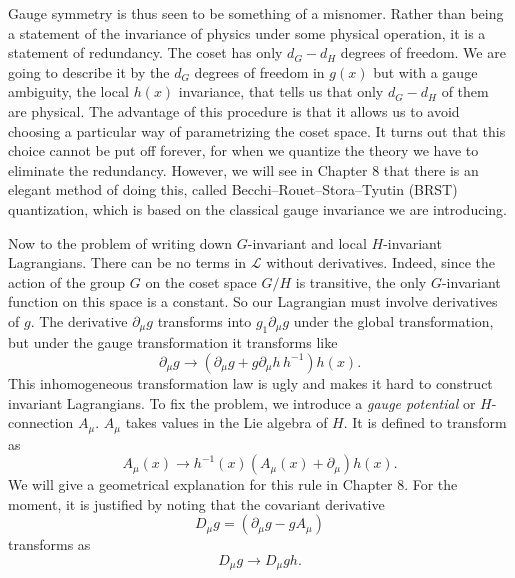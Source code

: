 Gauge symmetry is thus seen to be something of a misnomer. Rather than being a
statement of the invariance of physics under some physical operation, it is a
statement of redundancy. The coset has only $d_G-d_H$ degrees of freedom. We
are going to describe it by the $d_G$ degrees of freedom in $g(x)$ but with a
gauge ambiguity, the local $h(x)$ invariance, that tells us that only
$d_G-d_H$ of them are physical. The advantage of this procedure is that it
allows us to avoid choosing a particular way of parametrizing the coset space.
It turns out that this choice cannot be put off forever, for when we quantize
the theory we have to eliminate the redundancy. However, we will see in Chapter
8 that there is an elegant method of doing this, called Becchi--Rouet--Stora--Tyutin
(BRST) quantization, which is based on the classical gauge invariance we are
introducing.

Now to the problem of writing down $G$-invariant and local $H$-invariant
Lagrangians. There can be no terms in $\mathcal L$ without derivatives.
Indeed, since the action of the group $G$ on the coset space $G/H$ is
transitive, the only $G$-invariant function on this space is a constant. So our
Lagrangian must involve derivatives of $g$. The derivative $\partial_\mu g$
transforms into $g_1\partial_\mu g$ under the global transformation, but under
the gauge transformation it transforms like
\begin{equation}
  \partial_\mu g\longrightarrow(\partial_\mu g+g\partial_\mu h\,h^{-1})h(x).
  \label{eq:7.5}
\end{equation}
This inhomogeneous transformation law is ugly and makes it hard to construct
invariant Lagrangians. To fix the problem, we introduce a \emph{gauge potential}
or $H$-connection $A_\mu$. $A_\mu$ takes values in the Lie algebra of $H$. It
is defined to transform as
\begin{equation}
  A_\mu(x)\longrightarrow h^{-1}(x)(A_\mu(x)+\partial_\mu)h(x).
  \label{eq:7.6}
\end{equation}
We will give a geometrical explanation for this rule in Chapter 8. For the
moment, it is justified by noting that the covariant derivative
\begin{equation}
  D_\mu g=(\partial_\mu g-gA_\mu)
  \label{eq:7.7}
\end{equation}
transforms as
\begin{equation}
  D_\mu g\longrightarrow D_\mu gh.
  \label{eq:7.8}
\end{equation}

